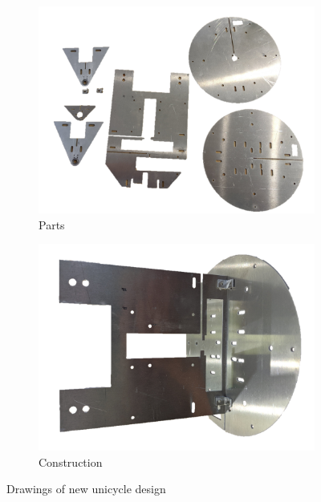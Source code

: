 \documentclass[twoside,twocolumn,12pt]{article}
\begin{document}
\begin{figure}[t!]
  \centering
  \begin{subfigure}[t]{\textwidth}
    \includegraphics[width=\linewidth]{partst}
   \caption{Parts}
  \label{sub:parts}
  \end{subfigure}  
  \newline  
  \begin{subfigure}[t]{0.6\textwidth}
    \includegraphics[width=\linewidth]{buildt}
    \caption{Construction}
  \label{sub:con}
  \end{subfigure}
  
  \caption{Drawings of new unicycle design}
  \label{fig:parts}
\end{figure}
\clearpage
\end{document}
